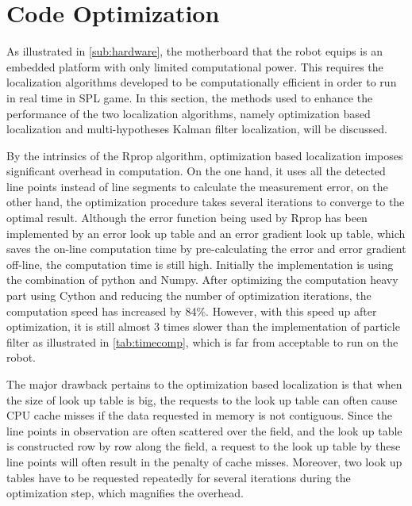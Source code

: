 




\section{Code Optimization}
\label{sec:Optimization}
As illustrated in \autoref{sub:hardware}, the motherboard that the robot equips is an embedded platform with only limited computational power. This requires the localization algorithms developed to be computationally efficient in order to run in real time in \gls{SPL} game. In this section, the methods used to enhance the performance of the two localization algorithms, namely optimization based localization and multi-hypotheses Kalman filter localization, will be discussed.

By the intrinsics of the Rprop algorithm, optimization based localization imposes significant overhead in computation. On the one hand, it uses all the detected line points instead of line segments to calculate the measurement error, on the other hand, the optimization procedure takes several iterations to converge to the optimal result. Although the error function being used by Rprop has been implemented by an error look up table and an error gradient look up table, which saves the on-line computation time by pre-calculating the error and error gradient off-line, the computation time is still high. Initially the implementation is using the combination of python and Numpy. After optimizing the computation heavy part using Cython and reducing the number of optimization iterations, the computation speed has increased by 84\%. However, with this speed up after optimization, it is still almost 3 times slower than the implementation of particle filter as illustrated in \autoref{tab:timecomp}, which is far from acceptable to run on the robot.

The major drawback pertains to the optimization based localization is that when the size of look up table is big, the requests to the look up table can often cause CPU cache misses if the data requested in memory is not contiguous. Since the line points in observation are often scattered over the field, and the look up table is constructed row by row along the field, a request to the look up table by these line points will often result in the penalty of cache misses. Moreover, two look up tables have to be requested repeatedly for several iterations during the optimization step, which magnifies the overhead.

